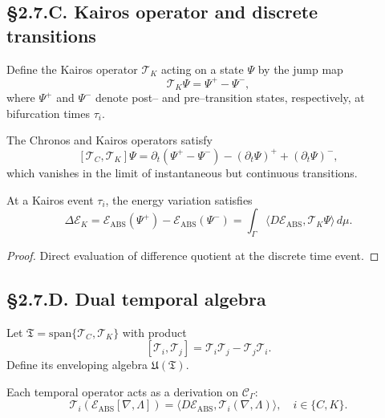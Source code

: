 \subsection*{§2.7.C. Kairos operator and discrete transitions}

\begin{definition}
Define the Kairos operator $\mathcal{T}_K$ acting on a state $\Psi$ by the jump map
\[
\mathcal{T}_K\Psi = \Psi^+ - \Psi^-,
\]
where $\Psi^+$ and $\Psi^-$ denote post– and pre–transition states, respectively, at bifurcation times $\tau_i$.
\]
\end{definition}

\begin{lemma}
The Chronos and Kairos operators satisfy
\[
[\mathcal{T}_C,\mathcal{T}_K]\Psi = \partial_t(\Psi^+ - \Psi^-)-(\partial_t\Psi)^+ + (\partial_t\Psi)^-,
\]
which vanishes in the limit of instantaneous but continuous transitions.
\end{lemma}

\begin{theorem}\label{thm:2.7.jump}
At a Kairos event $\tau_i$, the energy variation satisfies
\[
\Delta\mathcal{E}_K
=\mathcal{E}_{\mathrm{ABS}}(\Psi^+)-\mathcal{E}_{\mathrm{ABS}}(\Psi^-)
=\int_\Gamma \langle D\mathcal{E}_{\mathrm{ABS}},\mathcal{T}_K\Psi\rangle\,d\mu.
\]
\]
\end{theorem}

\begin{proof}
Direct evaluation of difference quotient at the discrete time event.
\end{proof}

\subsection*{§2.7.D. Dual temporal algebra}

\begin{definition}
Let $\mathfrak{T}=\mathrm{span}\{\mathcal{T}_C,\mathcal{T}_K\}$ with product
\[
[\mathcal{T}_i,\mathcal{T}_j]=\mathcal{T}_i\mathcal{T}_j-\mathcal{T}_j\mathcal{T}_i.
\]
\]
Define its enveloping algebra $\mathfrak{U}(\mathfrak{T})$.
\end{definition}

\begin{lemma}[Representation]
Each temporal operator acts as a derivation on $\mathcal{C}_\Gamma$:
\[
\mathcal{T}_i(\mathcal{E}_{\mathrm{ABS}}[\nabla,\Lambda])
=\langle D\mathcal{E}_{\mathrm{ABS}},\mathcal{T}_i(\nabla,\Lambda)\rangle,\quad i\in\{C,K\}.
\]
\]
\end{lemma}

